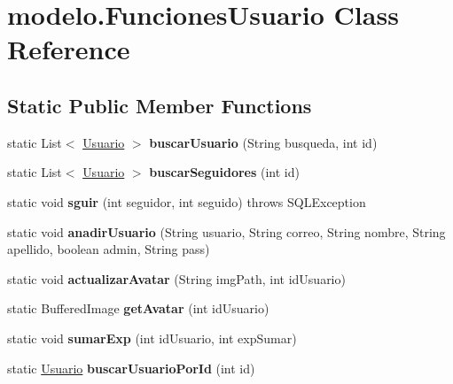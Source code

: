 \hypertarget{classmodelo_1_1_funciones_usuario}{}\section{modelo.\+Funciones\+Usuario Class Reference}
\label{classmodelo_1_1_funciones_usuario}
\subsection*{Static Public Member Functions}
\begin{DoxyCompactItemize}
\item 
\mbox{\label{classmodelo_1_1_funciones_usuario_a49d730e1fcebc465cf791fce48a34b95}} 
static List$<$ \mbox{\hyperlink{classmodelo_1_1_usuario}{Usuario}} $>$ {\bfseries buscar\+Usuario} (String busqueda, int id)
\item 
\mbox{\label{classmodelo_1_1_funciones_usuario_a6325b50dfce4ac36643c5ebbb03e931e}} 
static List$<$ \mbox{\hyperlink{classmodelo_1_1_usuario}{Usuario}} $>$ {\bfseries buscar\+Seguidores} (int id)
\item 
\mbox{\label{classmodelo_1_1_funciones_usuario_a7cdfd051909a2d4dccc72b036980a361}} 
static void {\bfseries sguir} (int seguidor, int seguido)  throws S\+Q\+L\+Exception 
\item 
\mbox{\label{classmodelo_1_1_funciones_usuario_a9da64b56e0ac7478737d48d4260fe745}} 
static void {\bfseries anadir\+Usuario} (String usuario, String correo, String nombre, String apellido, boolean admin, String pass)
\item 
\mbox{\label{classmodelo_1_1_funciones_usuario_acd3a29fd9df1482fba1fdd6628d7d6ee}} 
static void {\bfseries actualizar\+Avatar} (String img\+Path, int id\+Usuario)
\item 
\mbox{\label{classmodelo_1_1_funciones_usuario_a7b1637ae715ceea91d9884026ead80b6}} 
static Buffered\+Image {\bfseries get\+Avatar} (int id\+Usuario)
\item 
\mbox{\label{classmodelo_1_1_funciones_usuario_a054d140d4835b763885af853ce4065d5}} 
static void {\bfseries sumar\+Exp} (int id\+Usuario, int exp\+Sumar)
\item 
\mbox{\label{classmodelo_1_1_funciones_usuario_ae21c08bf2452095f1b71e6b5e1ef56a7}} 
static \mbox{\hyperlink{classmodelo_1_1_usuario}{Usuario}} {\bfseries buscar\+Usuario\+Por\+Id} (int id)
\end{DoxyCompactItemize}


